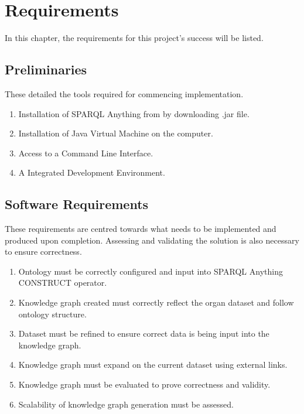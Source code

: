 \chapter{Requirements}
In this chapter, the requirements for this project's success will be listed.

\section{Preliminaries}
\hspace{0.5cm} These detailed the tools required for commencing implementation.
\begin{enumerate}
    \itemsep0em 
\item Installation of SPARQL Anything from \cite{sparqlanythinggithub} by downloading .jar file.
\item Installation of Java Virtual Machine on the computer. 
\item Access to a Command Line Interface.
\item A Integrated Development Environment.
\end{enumerate}

\section{Software Requirements}
\hspace{0.5cm} These requirements are centred towards what needs to be implemented and produced upon completion. Assessing and validating the solution is also necessary to ensure correctness.
\begin{enumerate}
    \itemsep0em 
\item Ontology must be correctly configured and input into SPARQL Anything CONSTRUCT operator.
\item Knowledge graph created must correctly reflect the organ dataset and follow ontology structure.
\item Dataset must be refined to ensure correct data is being input into the knowledge graph.
\item Knowledge graph must expand on the current dataset using external links.
\item Knowledge graph must be evaluated to prove correctness and validity.
\item Scalability of knowledge graph generation must be assessed.
\end{enumerate}

